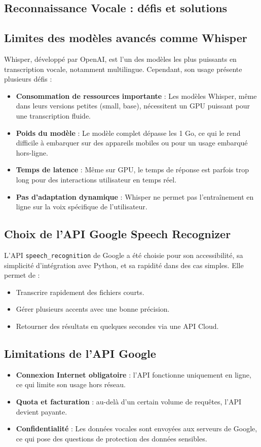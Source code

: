 \documentclass[12pt]{article}
\begin{document}
\begin{itemize}
	\section{Reconnaissance Vocale : défis et solutions}
	
	\subsection{Limites des modèles avancés comme Whisper}
	Whisper, développé par OpenAI, est l’un des modèles les plus puissants en transcription vocale, notamment multilingue. Cependant, son usage présente plusieurs défis :
	\begin{itemize}[label=--]
		\item \textbf{Consommation de ressources importante} : Les modèles Whisper, même dans leurs versions petites (small, base), nécessitent un GPU puissant pour une transcription fluide.
		\item \textbf{Poids du modèle} : Le modèle complet dépasse les 1 Go, ce qui le rend difficile à embarquer sur des appareils mobiles ou pour un usage embarqué hors-ligne.
		\item \textbf{Temps de latence} : Même sur GPU, le temps de réponse est parfois trop long pour des interactions utilisateur en temps réel.
		\item \textbf{Pas d’adaptation dynamique} : Whisper ne permet pas l’entraînement en ligne sur la voix spécifique de l'utilisateur.
	\end{itemize}
	
	\subsection{Choix de l'API Google Speech Recognizer}
	L’API \texttt{speech\_recognition} de Google a été choisie pour son accessibilité, sa simplicité d'intégration avec Python, et sa rapidité dans des cas simples. Elle permet de :
	\begin{itemize}[label=--]
		\item Transcrire rapidement des fichiers courts.
		\item Gérer plusieurs accents avec une bonne précision.
		\item Retourner des résultats en quelques secondes via une API Cloud.
	\end{itemize}
	
	\subsection{Limitations de l’API Google}
	\begin{itemize}[label=--]
		\item \textbf{Connexion Internet obligatoire} : l’API fonctionne uniquement en ligne, ce qui limite son usage hors réseau.
		\item \textbf{Quota et facturation} : au-delà d’un certain volume de requêtes, l’API devient payante.
		\item \textbf{Confidentialité} : Les données vocales sont envoyées aux serveurs de Google, ce qui pose des questions de protection des données sensibles.
	\end{itemize}
	

\end{itemize}
\end{document}
